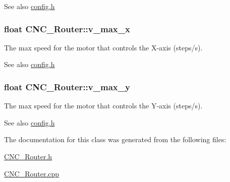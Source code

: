 \begin{DoxySeeAlso}{See also}
\hyperlink{config_8h}{config.\+h} 
\end{DoxySeeAlso}
\hypertarget{class_c_n_c___router_afa08612e63f2cc3d3283fa06679b5d7a}{
\subsubsection[{v\+\_\+max\+\_\+x}]{\setlength{\rightskip}{0pt plus 5cm}float C\+N\+C\+\_\+\+Router\+::v\+\_\+max\+\_\+x\hspace{0.3cm}{\ttfamily [private]}}}\label{class_c_n_c___router_afa08612e63f2cc3d3283fa06679b5d7a}


The max speed for the motor that controls the X-\/axis (steps/s). 

\begin{DoxySeeAlso}{See also}
\hyperlink{config_8h}{config.\+h} 
\end{DoxySeeAlso}
\hypertarget{class_c_n_c___router_a5e3fe2fd85292f3f5d9d2e13078b6a42}{
\subsubsection[{v\+\_\+max\+\_\+y}]{\setlength{\rightskip}{0pt plus 5cm}float C\+N\+C\+\_\+\+Router\+::v\+\_\+max\+\_\+y\hspace{0.3cm}{\ttfamily [private]}}}\label{class_c_n_c___router_a5e3fe2fd85292f3f5d9d2e13078b6a42}


The max speed for the motor that controls the Y-\/axis (steps/s). 

\begin{DoxySeeAlso}{See also}
\hyperlink{config_8h}{config.\+h} 
\end{DoxySeeAlso}


The documentation for this class was generated from the following files\+:\begin{DoxyCompactItemize}
\item 
\hyperlink{_c_n_c___router_8h}{C\+N\+C\+\_\+\+Router.\+h}\item 
\hyperlink{_c_n_c___router_8cpp}{C\+N\+C\+\_\+\+Router.\+cpp}\end{DoxyCompactItemize}

